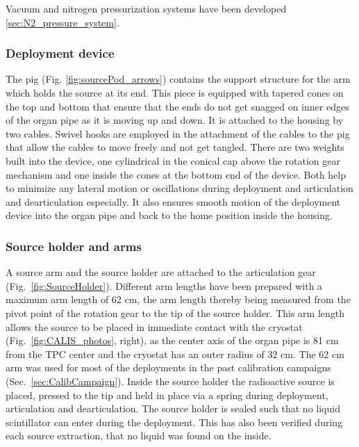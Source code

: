 Vacuum and nitrogen pressurization systems have been developed \ref{sec:N2_pressure_system}.

\subsubsection{Deployment device}
The pig (Fig. \ref{fig:sourcePod_arrows}) contains the support structure for the arm which holds the source at its end.  This piece is equipped with tapered cones on the top and bottom that ensure that the ends do not get snagged on inner edges of the organ pipe as it is moving up and down. It is attached to the housing by two cables.  Swivel hooks are employed in the attachment of the cables to the pig that allow the cables to move freely and not get tangled. 
There are two weights built into the device, one cylindrical in the conical cap above the rotation gear mechanism and one inside the cones at the bottom end of the device. Both help to minimize any lateral motion or oscillations during deployment and articulation and dearticulation especially. It also ensures smooth motion of the deployment device into the organ pipe and back to the home position inside the housing.

\subsubsection{Source holder and arms}
A source arm and the source holder are attached to the articulation gear (Fig.~\ref{fig:SourceHolder}). Different arm lengths have been prepared with a maximum arm length of 62 cm, the arm length thereby being measured from the pivot point of the rotation gear to the tip of the source holder. This arm length allows the source to be placed in immediate contact with the cryostat (Fig.~\ref{fig:CALIS_photos}, right), as the center axis of the organ pipe is 81 cm from the TPC center and the cryostat has an outer radius of 32 cm. The 62 cm arm was used for most of the deployments in the past calibration campaigns (Sec.~\ref{sec:CalibCampaign}). Inside the source holder the radioactive source is placed, pressed to the tip and held in place via a spring during deployment, articulation and dearticulation. The source holder is sealed such that no liquid scintillator can enter during the deployment. This has also been verified during each source extraction, that no liquid was found on the inside.

